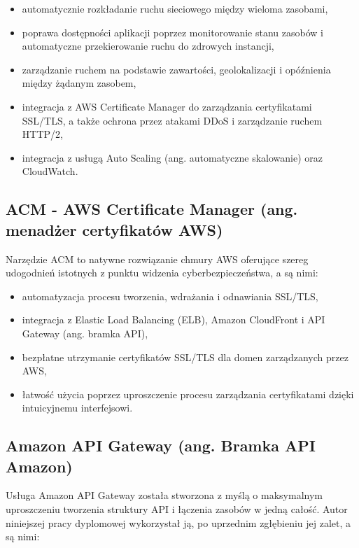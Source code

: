 \documentclass[12pt,twoside]{book}
\begin{document}
    \begin{itemize}
        \item automatycznie rozkładanie ruchu sieciowego między wieloma zasobami,
        \item poprawa dostępności aplikacji poprzez monitorowanie stanu zasobów i automatyczne przekierowanie ruchu do zdrowych instancji,
        \item zarządzanie ruchem na podstawie zawartości, geolokalizacji i opóźnienia między żądanym zasobem,
        \item integracja z AWS Certificate Manager do zarządzania certyfikatami SSL/TLS, a także ochrona przez atakami DDoS i zarządzanie ruchem HTTP/2,
        \item integracja z usługą Auto Scaling (ang. automatyczne skalowanie) oraz CloudWatch. \cite{aws.elb}
    \end{itemize}

    \subsection{ACM - AWS Certificate Manager (ang. menadżer certyfikatów AWS)}
    Narzędzie ACM to natywne rozwiązanie chmury AWS oferujące szereg udogodnień istotnych z punktu widzenia cyberbezpieczeństwa, a są nimi:

    \begin{itemize}
        \item automatyzacja procesu tworzenia, wdrażania i odnawiania SSL/TLS,
        \item integracja z Elastic Load Balancing (ELB), Amazon CloudFront i API Gateway (ang. bramka API),
        \item bezpłatne utrzymanie certyfikatów SSL/TLS dla domen zarządzanych przez AWS,
        \item łatwość użycia poprzez uproszczenie procesu zarządzania certyfikatami dzięki intuicyjnemu interfejsowi. \cite{aws.acm}
    \end{itemize}

    \subsection{Amazon API Gateway (ang. Bramka API Amazon)}
    Usługa Amazon API Gateway została stworzona z myślą o maksymalnym uproszczeniu tworzenia struktury API i łączenia zasobów w jedną całość. Autor niniejszej pracy dyplomowej wykorzystał ją, po uprzednim zgłębieniu jej zalet, a są nimi:
\end{document}
